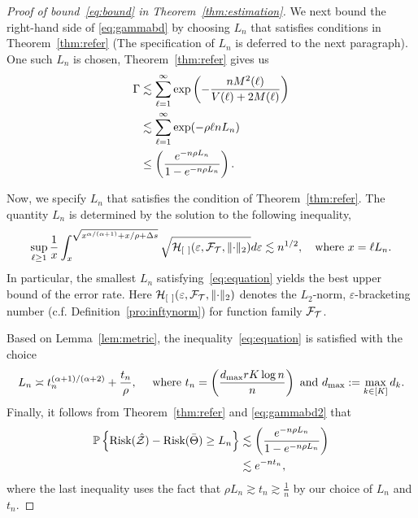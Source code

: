 \documentclass[twoside,11pt]{article}
\theoremstyle{definition}
\def\risk{\textup{Risk}}
\begin{document}
\begin{proof}[Proof of bound~\eqref{eq:bound} in Theorem~\ref{thm:estimation}]
We next bound the right-hand side of \eqref{eq:gammabd} by choosing $L_n$ that satisfies conditions in Theorem~\ref{thm:refer} (The specification of $L_n$ is deferred to the next paragraph). One such $L_n$ is chosen, Theorem~\ref{thm:refer} gives us 
\begin{align}\label{eq:gammabd2}
\Gamma&\lesssim \sum_{\ell=1}^\infty \exp\left(-\frac{nM^2(\ell)}{V(\ell)+2M(\ell)}\right)\\&\lesssim \sum_{\ell=1}^\infty	\exp(-\rho  \ell n L_n)\\&\leq \left(e^{-n\rho L_n}\over 1-e^{-n\rho L_n}\right).
\end{align}

Now, we specify $L_n$ that satisfies the condition of Theorem~\ref{thm:refer}. The quantity $L_n$ is determined by the solution to the following inequality,
\begin{equation}\label{eq:equation}
\sup_{\ell\geq 1}{1\over x}\int_{x}^{\sqrt{x^{\alpha/(\alpha+1)}+x/\rho+\Delta s}}\sqrt{\tH_{[\ ]}(\varepsilon, \tF_{\tT},\vnormSize{}{\cdot})}d\varepsilon \lesssim n^{1/2}, \quad \text{where }x=\ell L_n.
\end{equation}
In particular, the smallest $L_n$ satisfying~\eqref{eq:equation} yields the best upper bound of the error rate. Here $\tH_{[\ ]}(\varepsilon, \tF_{\tT}, \vnormSize{}{\cdot})$ denotes the $L_2$-norm, $\varepsilon$-bracketing number (c.f. Definition~\ref{pro:inftynorm}) for function family $\mathcal{F}_{\mathcal{T}}$.

Based on Lemma~\ref{lem:metric}, the inequality~\eqref{eq:equation} is satisfied with the choice
\begin{equation}\label{eq:delta}
L_n\asymp  t_n^{(\alpha+1)/(\alpha+2)}+{t_n\over \rho}, \quad \text{ where } t_n = \left(d_{\max}rK \log n\over n\right) \text{ and } d_{\max} := \max_{k\in[K]} d_k.
\end{equation}
Finally, it follows from Theorem~\ref{thm:refer} and \eqref{eq:gammabd2} that 
\begin{align}
\mathbb{P}\left\{\risk(\hat \tZ)-\risk(\bar\Theta)\geq L_n\right\}&\lesssim \left(e^{-n\rho L_n}\over 1-e^{-n\rho L_n}\right)\\&\lesssim e^{-nt_n},
\end{align}
where the last inequality uses the fact that $\rho L_n\gtrsim t_n\gtrsim \frac{1}{n}$ by our choice of $L_n$ and $t_n$.



\end{proof}
\end{document}
